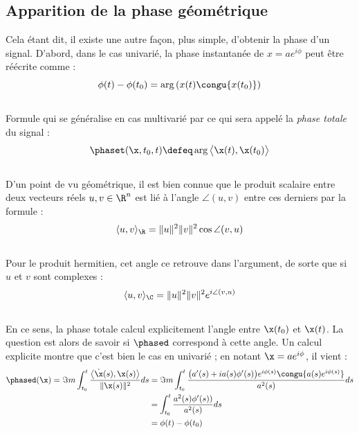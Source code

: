 \subsection{Apparition de la phase géométrique}\label{subsec:intro_phaseg}

Cela étant dit, il existe une autre façon, plus simple, d'obtenir la phase d'un signal. D'abord, dans le cas univarié, la phase instantanée de $x=ae^{i\phi}$ peut être réécrite comme :
\[\phi(t)-\phi(t_0)  = \arg\left( x(t) \congu{x(t_0)} \right)\]
\\
Formule qui se généralise en cas multivarié par ce qui sera appelé la \emph{phase totale} du signal :
\begin{equation}\label{eq:phase_t}
	\phaset(\x, t_0, t) \defeq \arg\big\langle \x(t), \x(t_0)\big\rangle
\end{equation}
\\
D'un point de vu géométrique, il est bien connue que le produit scalaire entre deux vecteurs réels $u,v\in\R^n$ est lié à l'angle $\angle(u,v)$ entre ces derniers par la formule :
\[\langle u,v\rangle_\R = \|u\|^2 \|v\|^2 \cos \angle(v,u)\]
\\
Pour le produit hermitien, cet angle ce retrouve dans l'argument, de sorte que si $u$ et $v$ sont complexes :
\[\langle u,v\rangle_\C = \|u\|^2 \|v\|^2 e^{i \angle(v,u)}\]
\\
En ce sens, la phase totale calcul explicitement l'angle entre $\x(t_0)$ et $\x(t)$. La question est alors de savoir si $\phased$ correspond à cette angle. 
Un calcul explicite montre que c'est bien le cas en univarié ; en notant $\x = ae^{i\phi}$, il vient :
\begin{align*}
	\phased(\x) = \Im m\int_{t_0}^t \frac{\big\langle \dot{\x}(s) , \x(s) \big\rangle}{\|\x(s)\|^2} ds &= \Im m \int_{t_0}^t \frac{\big(a'(s) + ia(s)\phi'(s) \big) e^{i\phi(s)} \congu{a(s) e^{i\phi(s)}}}{a^2(s)} ds \\
	&= \int_{t_0}^t \frac{a^2(s)\phi'(s))}{a^2(s)} ds \\
	&= \phi(t) - \phi(t_0)
\end{align*}
\skipl

